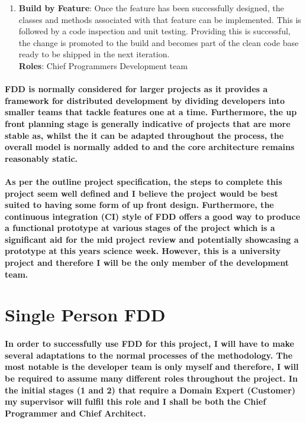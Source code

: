 \documentclass{article}
\begin{document}
\begin{enumerate}
	
	\item \textbf{Build by Feature}: Once the feature has been successfully designed, the classes and methods associated with that feature can be implemented. This is followed by a code inspection and unit testing. Providing this is successful, the change is promoted to the build and becomes part of the clean code base ready to be shipped in the next iteration.
	\\
	\textbf{Roles}: Chief Programmers \textbullet{} Development team

\end{enumerate}

\paragraph{FDD is normally considered for larger projects as it provides a framework for distributed development by dividing developers into smaller teams that tackle features one at a time. Furthermore, the up front planning stage is generally indicative of projects that are more stable as, whilst the it can be adapted throughout the process, the overall model is normally added to and the core architecture remains reasonably static.}

\paragraph{As per the outline project specification, the steps to complete this project seem well defined and I believe the project would be best suited to having some form of up front design. Furthermore, the continuous integration (CI) style of FDD offers a good way to produce a functional prototype at various stages of the project which is a significant aid for the mid project review and potentially showcasing a prototype at this years science week. However, this is a university project and therefore I will be the only member of the development team. }

\section{Single Person FDD}
\paragraph{In order to successfully use FDD for this project, I will have to make several adaptations to the normal processes of the methodology. The most notable is the developer team is only myself and therefore, I will be required to assume many different roles throughout the project. In the initial stages (1 and 2) that require a Domain Expert (Customer) my supervisor will fulfil this role and I shall be both the Chief Programmer and Chief Architect.}
\end{document}
